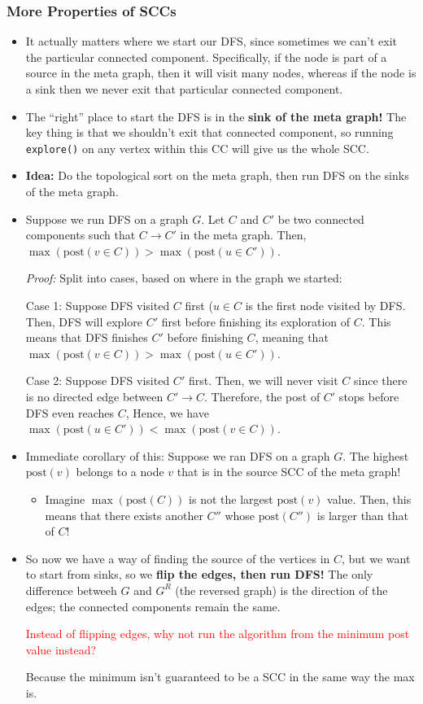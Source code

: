 \documentclass[10pt]{article}
\newcommand{\post}{\mathrm{post}}
\newcommand{\question}[1]{\textcolor{red}{#1}}
\newcommand{\answer}[1]{\textcolor{green!80!black!}{#1}}
\begin{document}
	\subsubsection{More Properties of SCCs}
	\begin{itemize}
		\item It actually matters where we start our DFS, since sometimes we can't exit the particular 
			connected component. Specifically, if the node is part of a source in the meta graph, then 
			it will visit many nodes, whereas if the node is a sink then we never exit that particular connected
			component.
		\item The ``right'' place to start the DFS is in the \textbf{sink of the meta graph!} The key 
			thing is that we shouldn't exit that connected component, so running \texttt{explore()} on 
			any vertex within this CC will give us the whole SCC.
		\item \textbf{Idea:} Do the topological sort on the meta graph, then run DFS on the sinks of 
			the meta graph.
		\item Suppose we run DFS on a graph $G$. Let $C$ and $C'$ be two connected components such that $C \to 
			C'$ in the meta graph. Then, $\max(\post(v \in C)) > \max(\post(u \in C'))$.

			\textit{Proof:} Split into cases, based on where in the graph we started:

			Case 1: Suppose DFS visited $C$ first ($u \in C$ is the first node visited by DFS. Then, 
			DFS will explore $C'$ first before finishing its exploration of $C$. This means that DFS finishes
			$C'$ before finishing $C$, meaning that $\max(\post(v \in C)) > \max(\post(u \in C'))$.

			Case 2: Suppose DFS visited $C'$ first. Then, we will never visit $C$ since there is no directed
			edge between $C' \to C$. Therefore, the post of $C'$ stops before DFS even reaches $C$, Hence, 
			we have $\max(\post(u \in C')) < \max(\post(v \in C))$. 
		\item Immediate corollary of this: Suppose we ran DFS on a graph $G$. The highest $\post(v)$ belongs 
			to a node $v$ that is in the source SCC of the meta graph!
			\begin{itemize}
				\item Imagine $\max(\post(C))$ is not the largest $\post(v)$ value. Then, this means that 
					there exists another $C''$ whose $\post(C'')$ is larger than that of $C$!
			\end{itemize}
		\item So now we have a way of finding the source of the vertices in $C$, but we want to start from 
			sinks, so we \textbf{flip the edges, then run DFS!} The only difference betweeh $G$ and $G^R$ (the 
			reversed graph) is the direction of the edges; the connected components remain the same.

			\question{Instead of flipping edges, why not run the algorithm from the minimum post value 
			instead?}

			\answer{Because the minimum isn't guaranteed to be a SCC in the same way the max is.}
	\end{itemize}
\end{document}
